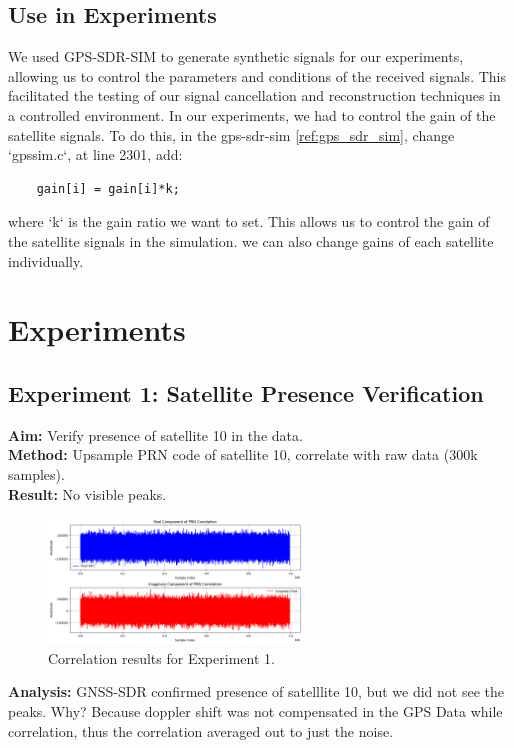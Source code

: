 \documentclass[12pt]{report}
\begin{document}
\subsection{Use in Experiments}
We used GPS-SDR-SIM to generate synthetic signals for our experiments, allowing us to control the parameters and conditions of the received signals. This facilitated the testing of our signal cancellation and reconstruction techniques in a controlled environment.
In our experiments, we had to control the gain of the satellite signals. To do this, in the gps-sdr-sim \ref{ref:gps_sdr_sim}, change `gpssim.c`, at line 2301, add:
\begin{verbatim}
    gain[i] = gain[i]*k;
\end{verbatim}
where `k` is the gain ratio we want to set. This allows us to control the gain of the satellite signals in the simulation. we can also change gains of each satellite individually.
\section{Experiments}

\subsection{Experiment 1: Satellite Presence Verification}
\textbf{Aim:} Verify presence of satellite 10 in the data. \\
\textbf{Method:} Upsample PRN code of satellite 10, correlate with raw data (300k samples). \\
\textbf{Result:} No visible peaks.

\begin{figure}[H]
    \centering
    \includegraphics[width=0.6\textwidth]{exp1.png}
    \caption{Correlation results for Experiment 1.}
    \label{fig:exp1}
\end{figure}

\textbf{Analysis:} GNSS-SDR confirmed presence of satelllite 10, but we did not see the peaks. Why? Because doppler shift was not compensated in the GPS Data while correlation, thus the correlation averaged out to just the noise.
\end{document}
